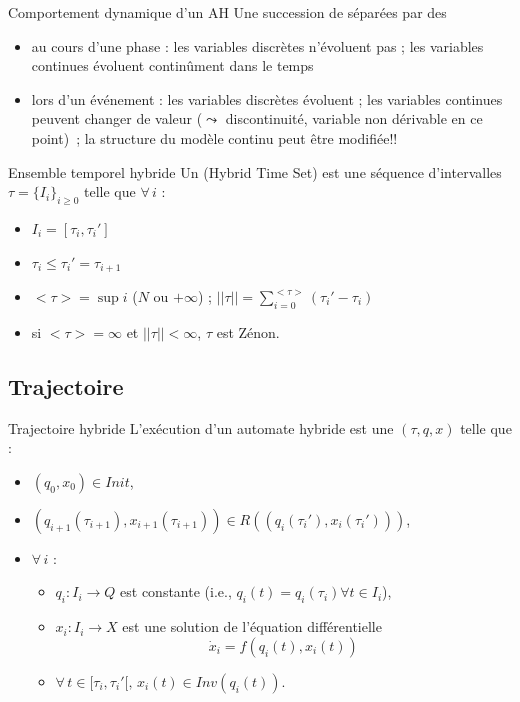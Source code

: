 \documentclass[compress]{beamer}
\begin{document}
\begin{frame}{Comportement dynamique d'un AH}
Une succession de  séparées par des 
\begin{itemize}
\item au cours d'une phase : les variables discrètes n'évoluent pas ; les variables continues
	évoluent continûment dans le temps
\item lors d'un événement :  les variables discrètes évoluent ; les variables continues peuvent
	changer de valeur ($\leadsto$ discontinuité, variable non dérivable en ce point)~; la
	structure du modèle continu peut être modifiée!!
\end{itemize}
\end{frame}

\begin{frame}{Ensemble temporel hybride}
Un  (Hybrid Time Set) est une séquence d'intervalles $\tau = \{I_i\}_{i \geq 0}$ telle que $\forall \, i$ :
\begin{itemize}
\item $I_i = [\tau_i, \tau_i']$
\item $\tau_i \leq \tau_i' = \tau_{i+1}$
\end{itemize}
\vspace{1cm}
\begin{itemize}
\item $<\tau> = \sup i$ ($N$ ou $+\infty$) ; 
	$\displaystyle ||\tau|| = \sum_{i=0}^{<\tau>} (\tau_i' - \tau_i)$
\item si $<\tau> = \infty$ et $||\tau|| < \infty$, $\tau$ est Zénon.
\end{itemize}
\end{frame}

\subsection{Trajectoire}

\begin{frame}{Trajectoire hybride}
L'exécution d'un automate hybride est une  $(\tau, q, x)$ telle que :
\begin{itemize}
\item $(q_0, x_0) \in Init$,
\item $(q_{i+1}(\tau_{i+1}), x_{i+1}(\tau_{i+1})) \in R((q_i(\tau_i'), x_i(\tau_i')))$,
\item $\forall \, i$ :
	\begin{itemize}
	\item $q_i : I_i \rightarrow Q$ est constante (i.e., $q_i(t) = q_i(\tau_i) \forall t \in I_i$),
	\item $x_i : I_i \rightarrow X$ est une solution de l'équation différentielle 
		$$\dot{x}_i = f(q_i(t), x_i(t))$$
	\item $\forall \, t \in [\tau_i, \tau_i'[, \, x_i(t) \in Inv(q_i(t))$.
	\end{itemize}
\end{itemize}
\end{frame}
\end{document}
